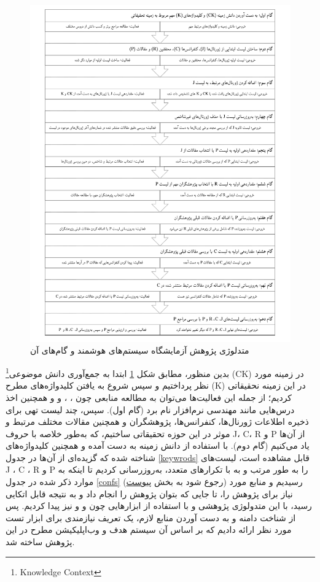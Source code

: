 \documentclass{article}
\theoremstyle{definition}
\begin{document}
\begin{figure}[H]
	\centering\includegraphics[width=0.75\linewidth]{Resources/ISLAB_methodology.pdf}
	\caption{متدلوژی پژوهش آزمایشگاه سیستم‌های هوشمند و گام‌های آن}
	\label{islab}
\end{figure}
بدین منظور،‌  مطابق  شکل 
\ref{islab}
ابتدا به جمع‌آوری دانش موضوعی\footnote{Knowledge Context} (CK) در زمینه مورد نظر پرداختیم و سپس شروع به یافتن کلیدواژه‌های مطرح (K) در این زمینه نحقیقاتی کردیم؛ از جمله این فعالیت‌ها می‌توان به مطالعه منابعی چون
\cite{measuring}، \cite{pressman}، \cite{main2} و \cite{sommerville}
و همچنین اخذ درس‌هایی مانند مهندسی نرم‌افزار نام برد (گام اول).
سپس، چند لیست تهی برای ذخیره اطلاعات ژورنال‌ها، کنفرانس‌ها، پژوهشگران و همچنین مقالات مختلف مرتبط و موثر در این حوزه تحقیقاتی ساختیم، که به‌طور خلاصه با حروف J، C، R و P از آن‌ها یاد می‌کنیم (گام دوم).
با استفاده از دانش زمینه به دست آمده و همچنین کلیدواژه‌های شناخته شده که گزیده‌ای از آن‌ها در جدول 
\ref{keywrods}
قابل مشاهده است، لیست‌های J ، C ، R و P را به طور مرتب و به با تکرارهای متعدد، به‌روزرسانی کردیم تا اینکه به موارد ذکر شده در جدول
\ref{confs}
(رجوع شود به بخش
\hyperref[sec:appendix]{پیوست})
رسیدیم و منابع مورد نیاز برای پژوهش را، تا جایی که بتوان پژوهش را انجام داد و به نتیجه قابل اتکایی رسید، با این متدولوژی پژوهشی و با استفاده از ابزارهایی چون
\cite{core}
و 
\cite{dblp}
و نیز
\cite{scimago}
پیدا کردیم. پس از شناخت دامنه و به دست آوردن منابع لازم، یک تعریف نیازمندی برای ابزار تست مورد نظر ارائه دادیم که بر اساس آن سیستم هدف و وب‌اپلیکیشن مطرح در این پژوهش ساخته شد.
\end{document}
